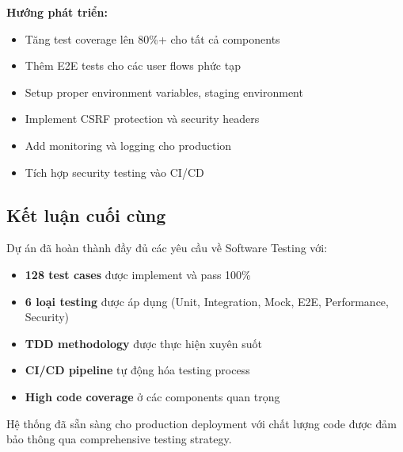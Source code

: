 \textbf{Hướng phát triển:}
\begin{itemize}
    \item Tăng test coverage lên 80\%+ cho tất cả components
    \item Thêm E2E tests cho các user flows phức tạp
    \item Setup proper environment variables, staging environment
    \item Implement CSRF protection và security headers
    \item Add monitoring và logging cho production
    \item Tích hợp security testing vào CI/CD
\end{itemize}

\subsection{Kết luận cuối cùng}

Dự án đã hoàn thành đầy đủ các yêu cầu về Software Testing với:
\begin{itemize}
    \item \textbf{128 test cases} được implement và pass 100\%
    \item \textbf{6 loại testing} được áp dụng (Unit, Integration, Mock, E2E, Performance, Security)
    \item \textbf{TDD methodology} được thực hiện xuyên suốt
    \item \textbf{CI/CD pipeline} tự động hóa testing process
    \item \textbf{High code coverage} ở các components quan trọng
\end{itemize}

Hệ thống đã sẵn sàng cho production deployment với chất lượng code được đảm bảo thông qua comprehensive testing strategy.
